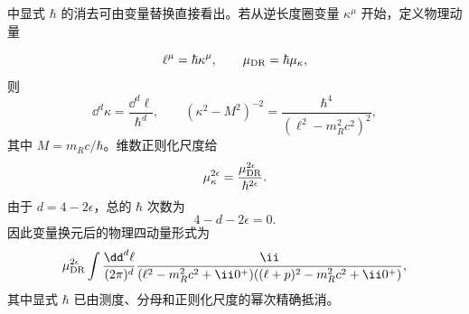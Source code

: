 
\begin{derivation}
 中显式 \(\hbar\) 的消去可由变量替换直接看出。若从逆长度圈变量 \(\kappa^\mu\) 开始，定义物理动量

\begin{equation*}
 \ell^\mu=\hbar\kappa^\mu,
 \qquad
 \mu_{\rm DR}=\hbar\mu_\kappa,
\end{equation*}
则
\begin{equation*}
 \dd^d \kappa=\frac{\dd^d \ell}{\hbar^d},
 \qquad
 (\kappa^2-M^2)^{-2}
 =\frac{\hbar^4}{(\ell^2-m_R^2c^2)^2},
\end{equation*}
其中 \(M=m_Rc/\hbar\)。维数正则化尺度给
\begin{equation*}
 \mu_\kappa^{2\epsilon}
 =\frac{\mu_{\rm DR}^{2\epsilon}}{\hbar^{2\epsilon}}.
\end{equation*}
由于 \(d=4-2\epsilon\)，总的 \(\hbar\) 次数为
\begin{equation*}
 4-d-2\epsilon=0.
\end{equation*}
因此变量换元后的物理四动量形式为
\begin{equation*}
 \mu_{\rm DR}^{2\epsilon}
 \int\frac{\dd^d \ell}{(2\pi)^d}
 \frac{\ii}{(\ell^2-m_R^2c^2+\ii0^+)
 ((\ell+p)^2-m_R^2c^2+\ii0^+)},
\end{equation*}
其中显式 $\hbar$ 已由测度、分母和正则化尺度的幂次精确抵消。


\end{derivation}
